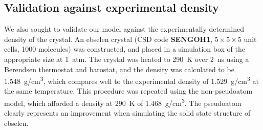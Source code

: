 \begin{refsection}
\subsection{Validation against experimental density}
We also sought to validate our model against the experimentally determined density of the crystal.
An ebselen crystal (CSD code \textbf{SENGOH1}, $ 5 \times 5 \times 5 $ unit cells, 1000 molecules) was constructed, and placed in a simulation box of the appropriate size at 1~atm.
The crystal was heated to 290~K over 2~ns using a Berendsen thermostat and barostat, and the density was calculated to be 1.548~g/cm\textsuperscript{3}, which compares well to the experimental density of 1.529~g/cm\textsuperscript{3} at the same temperature.\autocite{Dupont1990StructuresII}
This procedure was repeated using the non-pseudoatom model, which afforded a density at 290~K of 1.468~g/cm\textsuperscript{3}.
The pseudoatom clearly represents an improvement when simulating the solid state structure of ebselen.


\end{refsection}

